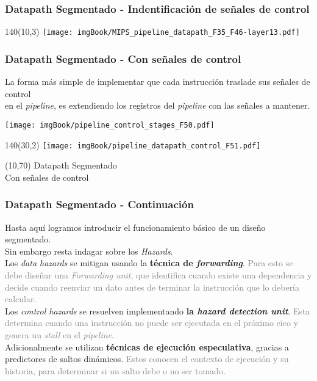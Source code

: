\documentclass[aspectratio=169]{beamer}
\begin{document}
\begin{frame}[t,fragile]
    \frametitle{Datapath Segmentado - Indentificación de señales de control}
    \begin{textblock}{140}(10,3) \texttt{[image: imgBook/MIPS\_pipeline\_datapath\_F35\_F46-layer13.pdf]} \end{textblock}
\end{frame}

\begin{frame}[t,fragile]
\frametitle{Datapath Segmentado - Con señales de control}
    La forma más simple de implementar que cada instrucción traslade sus señales de control\\
    en el \emph{pipeline}, es \textcolor{naranjauca}{extendiendo los registros del \emph{pipeline} con las señales a mantener.}
    \begin{center}
    \texttt{[image: imgBook/pipeline\_control\_stages\_F50.pdf]}
    \end{center}
\end{frame}

\begin{frame}[t,fragile]
    \begin{textblock}{140}(30,2) \texttt{[image: imgBook/pipeline\_datapath\_control\_F51.pdf]} \end{textblock}
    \begin{textblock}{50}(10,70)
    {\Large \textcolor{naranjauca}{Datapath Segmentado\\ Con señales de control}}
    \end{textblock}
\end{frame}

\begin{frame}[t,fragile]
\frametitle{Datapath Segmentado - Continuación}
    Hasta aquí logramos introducir el funcionamiento básico de un diseño segmentado.\\
    \textcolor{naranjauca}{Sin embargo resta indagar sobre los \emph{Hazards}.\\}
    \bigskip
    \pause
    Los \emph{data hazards} se mitigan usando la \textbf{técnica de \emph{forwarding}}.
    \textcolor{gray}{Para esto se debe diseñar una \emph{Forwarding unit}, que identifica cuando existe una dependencia y decide cuando reenviar un dato antes de terminar la instrucción que lo debería calcular.\\}
    \bigskip
    \pause
    Los \emph{control hazards} se resuelven implementando \textbf{la \emph{hazard detection unit}}.
    \textcolor{gray}{Esta determina cuando una instrucción no puede ser ejecutada en el próximo cico y genera un \emph{stall} en el \emph{pipeline}.\\}
    \bigskip
    \pause
    Adicionalmente se utilizan \textbf{técnicas de ejecución especulativa}, gracias a predictores de saltos dinámicos.
    \textcolor{gray}{Estos conocen el contexto de ejecución y su historia, para determinar si un salto debe o no ser tomado.\\}
\end{frame}
\end{document}
